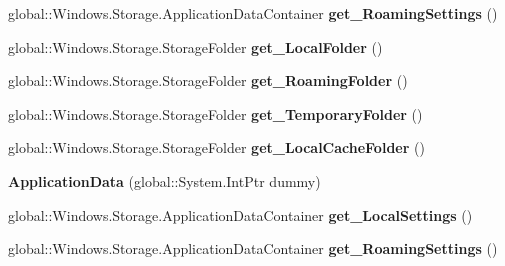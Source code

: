 \begin{DoxyCompactItemize}
\item 
\mbox{\label{class_windows_1_1_storage_1_1_application_data_a27e78d63f97516acd70935e1472a8c98}} 
global\+::\+Windows.\+Storage.\+Application\+Data\+Container {\bfseries get\+\_\+\+Roaming\+Settings} ()
\item 
\mbox{\label{class_windows_1_1_storage_1_1_application_data_a4be66d1c6f347f25204f30fba6f63485}} 
global\+::\+Windows.\+Storage.\+Storage\+Folder {\bfseries get\+\_\+\+Local\+Folder} ()
\item 
\mbox{\label{class_windows_1_1_storage_1_1_application_data_a195408f98de3b9e189bb12ea66880cb6}} 
global\+::\+Windows.\+Storage.\+Storage\+Folder {\bfseries get\+\_\+\+Roaming\+Folder} ()
\item 
\mbox{\label{class_windows_1_1_storage_1_1_application_data_a3f3b3cf88635a6774215a68677f6e5a7}} 
global\+::\+Windows.\+Storage.\+Storage\+Folder {\bfseries get\+\_\+\+Temporary\+Folder} ()
\item 
\mbox{\label{class_windows_1_1_storage_1_1_application_data_a1f35e4887e3eb7dd667bf1900f0371ce}} 
global\+::\+Windows.\+Storage.\+Storage\+Folder {\bfseries get\+\_\+\+Local\+Cache\+Folder} ()
\item 
\mbox{\label{class_windows_1_1_storage_1_1_application_data_a870285ae522d1069764e2fec1208bffb}} 
{\bfseries Application\+Data} (global\+::\+System.\+Int\+Ptr dummy)
\item 
\mbox{\label{class_windows_1_1_storage_1_1_application_data_aa776fab90569a200a9729b7a18d9f4aa}} 
global\+::\+Windows.\+Storage.\+Application\+Data\+Container {\bfseries get\+\_\+\+Local\+Settings} ()
\item 
\mbox{\label{class_windows_1_1_storage_1_1_application_data_a27e78d63f97516acd70935e1472a8c98}} 
global\+::\+Windows.\+Storage.\+Application\+Data\+Container {\bfseries get\+\_\+\+Roaming\+Settings} ()

\end{DoxyCompactItemize}
